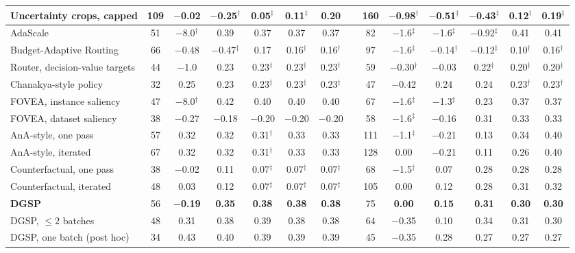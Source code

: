\documentclass[10pt,letterpaper]{article}
\newcommand{\method}{DGSP\xspace}
\newcommand{\oursrow}{\rowcolor{oursbg}}
\theoremstyle{remark}
\theoremstyle{plain}
\theoremstyle{definition}
\begin{document}
\begin{table}[!htbp]
\begin{tabular}{@{}lccccccccccccc@{}}
Uncertainty crops, capped & 109 & $-$0.02 & $-$0.25$^{\dagger}$ & 0.05$^{\ddagger}$ & 0.11$^{\ddagger}$ & 0.20 & & 160 & $-$0.98$^{\dagger}$ & $-$0.51$^{\ddagger}$ & $-$0.43$^{\ddagger}$ & 0.12$^{\dagger}$ & 0.19$^{\ddagger}$ \\
\midrule
AdaScale & 51 & $-$8.0$^{\dagger}$ & 0.39 & 0.37 & 0.37 & 0.37 & & 82 & $-$1.6$^{\ddagger}$ & $-$1.6$^{\ddagger}$ & $-$0.92$^{\ddagger}$ & 0.41 & 0.41 \\
Budget-Adaptive Routing & 66 & $-$0.48 & $-$0.47$^{\ddagger}$ & 0.17 & 0.16$^{\dagger}$ & 0.16$^{\dagger}$ & & 97 & $-$1.6$^{\ddagger}$ & $-$0.14$^{\dagger}$ & $-$0.12$^{\ddagger}$ & 0.10$^{\dagger}$ & 0.16$^{\dagger}$ \\
Router, decision-value targets & 44 & $-$1.0 & 0.23 & 0.23$^{\ddagger}$ & 0.23$^{\dagger}$ & 0.23$^{\dagger}$ & & 59 & $-$0.30$^{\dagger}$ & $-$0.03 & 0.22$^{\ddagger}$ & 0.20$^{\ddagger}$ & 0.20$^{\ddagger}$ \\
Chanakya-style policy & 32 & 0.25 & 0.23 & 0.23$^{\ddagger}$ & 0.23$^{\ddagger}$ & 0.23$^{\ddagger}$ & & 47 & $-$0.42 & 0.24 & 0.24 & 0.23$^{\dagger}$ & 0.23$^{\dagger}$ \\
FOVEA, instance saliency & 47 & $-$8.0$^{\dagger}$ & 0.42 & 0.40 & 0.40 & 0.40 & & 67 & $-$1.6$^{\ddagger}$ & $-$1.3$^{\ddagger}$ & 0.23 & 0.37 & 0.37 \\
FOVEA, dataset saliency & 38 & $-$0.27 & $-$0.18 & $-$0.20 & $-$0.20 & $-$0.20 & & 58 & $-$1.6$^{\ddagger}$ & $-$0.16 & 0.31 & 0.33 & 0.33 \\
AnA-style, one pass & 57 & 0.32 & 0.32 & 0.31$^{\dagger}$ & 0.33 & 0.33 & & 111 & $-$1.1$^{\ddagger}$ & $-$0.21 & 0.13 & 0.34 & 0.40 \\
AnA-style, iterated & 67 & 0.32 & 0.32 & 0.31$^{\dagger}$ & 0.33 & 0.33 & & 128 & 0.00 & $-$0.21 & 0.11 & 0.26 & 0.40 \\
Counterfactual, one pass & 38 & $-$0.02 & 0.11 & 0.07$^{\ddagger}$ & 0.07$^{\ddagger}$ & 0.07$^{\ddagger}$ & & 68 & $-$1.5$^{\ddagger}$ & 0.07 & 0.28 & 0.28 & 0.28 \\
Counterfactual, iterated & 48 & 0.03 & 0.12 & 0.07$^{\ddagger}$ & 0.07$^{\ddagger}$ & 0.07$^{\ddagger}$ & & 105 & 0.00 & 0.12 & 0.28 & 0.31 & 0.32 \\
\midrule
\oursrow \textbf{\method} & 56 & \textbf{$-$0.19} & \textbf{0.35} & \textbf{0.38} & \textbf{0.38} & \textbf{0.38} & & 75 & \textbf{0.00} & \textbf{0.15} & \textbf{0.31} & \textbf{0.30} & \textbf{0.30} \\
\method, $\le2$ batches & 48 & 0.31 & 0.38 & 0.39 & 0.38 & 0.38 & & 64 & $-$0.35 & 0.10 & 0.34 & 0.31 & 0.30 \\
\method, one batch (post hoc) & 34 & 0.43 & 0.40 & 0.39 & 0.39 & 0.39 & & 45 & $-$0.35 & 0.28 & 0.27 & 0.27 & 0.27 \\
\bottomrule
\end{tabular}
\end{table}
\end{document}
